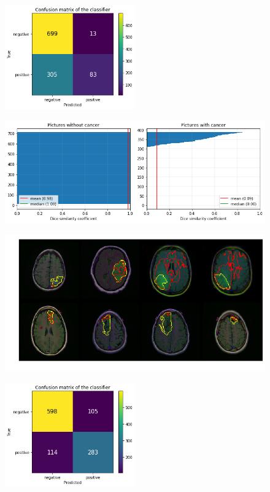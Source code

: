 \begin{figure}[h!]
    \centering
    \includegraphics[width=0.5\textwidth]{images/logreg_cm}
    \caption{}
    \label{fig:logreg_cm}
\end{figure}

\begin{figure}[h!]
    \centering
    \includegraphics[width=1.0\textwidth]{images/logreg_dsc}
    \caption{}
    \label{fig:logreg_dsc}
\end{figure}

\begin{figure}[h!]
    \centering
    \includegraphics[width=1.0\textwidth]{images/simcnn_mask}
    \caption{}
    \label{fig:simcnn_mask}
\end{figure}

\begin{figure}[h!]
    \centering
    \includegraphics[width=0.5\textwidth]{images/simcnn_cm}
    \caption{}
    \label{fig:simcnn_cm}
\end{figure}

